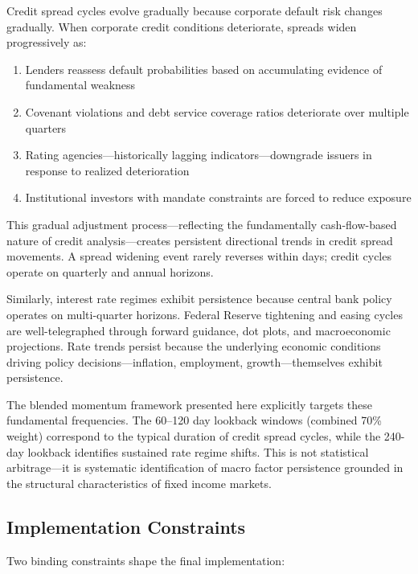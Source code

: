 \documentclass[11pt]{article}
\begin{document}
Credit spread cycles evolve gradually because corporate default risk changes gradually. When corporate credit conditions deteriorate, spreads widen progressively as:
\begin{enumerate}
    \item Lenders reassess default probabilities based on accumulating evidence of fundamental weakness
    \item Covenant violations and debt service coverage ratios deteriorate over multiple quarters
    \item Rating agencies---historically lagging indicators---downgrade issuers in response to realized deterioration
    \item Institutional investors with mandate constraints are forced to reduce exposure
\end{enumerate}

This gradual adjustment process---reflecting the fundamentally cash-flow-based nature of credit analysis---creates persistent directional trends in credit spread movements. A spread widening event rarely reverses within days; credit cycles operate on quarterly and annual horizons.

Similarly, interest rate regimes exhibit persistence because central bank policy operates on multi-quarter horizons. Federal Reserve tightening and easing cycles are well-telegraphed through forward guidance, dot plots, and macroeconomic projections. Rate trends persist because the underlying economic conditions driving policy decisions---inflation, employment, growth---themselves exhibit persistence.

The blended momentum framework presented here explicitly targets these fundamental frequencies. The 60--120 day lookback windows (combined 70\% weight) correspond to the typical duration of credit spread cycles, while the 240-day lookback identifies sustained rate regime shifts. This is not statistical arbitrage---it is systematic identification of macro factor persistence grounded in the structural characteristics of fixed income markets.

\subsection{Implementation Constraints}

Two binding constraints shape the final implementation:
\end{document}

